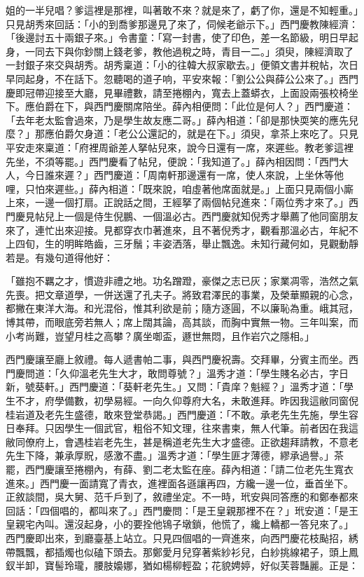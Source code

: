 \begin{showcontents}{}
姐的一半兒唱？爹這裡是那裡，叫著敢不來？就是來了，虧了你，還是不知輕重。」只見胡秀來回話：「小的到喬爹那邊見了來了，伺候老爺示下。」西門慶教陳經濟：「後邊討五十兩銀子來。」令書童：「寫一封書，使了印色，差一名節級，明日早起身，一同去下與你鈔關上錢老爹，教他過稅之時，青目一二。」須臾，陳經濟取了一封銀子來交與胡秀。胡秀稟道：「小的往韓大叔家歇去。」便領文書并稅帖，次日早同起身，不在話下。忽聽喝的道子响，平安來報：「劉公公與薛公公來了。」西門慶即冠帶迎接至大廳，見畢禮數，請至捲棚內，寬去上蓋蟒衣，上面設兩張校椅坐下。應伯爵在下，與西門慶關席陪坐。薛內相便問：「此位是何人？」西門慶道：「去年老太監會過來，乃是學生故友應二哥。」薛內相道：「卻是那快耎笑的應先兒麼？」那應伯爵欠身道：「老公公還記的，就是在下。」須臾，拿茶上來吃了。只見平安走來稟道：「府裡周爺差人拏帖兒來，說今日還有一席，來遲些。教老爹這裡先坐，不須等罷。」西門慶看了帖兒，便說：「我知道了。」薛內相因問：「西門大人，今日誰來遲？」西門慶道：「周南軒那邊還有一席，使人來說，上坐休等他哩，只怕來遲些。」薛內相道：「既來說，咱虛著他席面就是。」上面只見兩個小廝上來，一邊一個打扇。正說話之間，王經拏了兩個帖兒進來：「兩位秀才來了。」西門慶見帖兒上一個是侍生倪鵬、一個溫必古。西門慶就知倪秀才舉薦了他同窗朋友來了，連忙出來迎接。見都穿衣巾著進來，且不著倪秀才，觀看那溫必古，年紀不上四旬，生的明眸皓齒，三牙鬚；丰姿洒落，舉止飄逸。未知行藏何如，見觀動靜若是。有幾句道得他好：

「雖抱不羈之才，慣遊非禮之地。功名蹭蹬，豪傑之志已灰；家業凋零，浩然之氣先喪。把文章道學，一併送還了孔夫子。將致君澤民的事業，及榮華顯親的心念，都撇在東洋大海。和光混俗，惟其利欲是前；隨方逐圓，不以廉恥為重。峨其冠，博其帶，而眼底旁若無人；席上闊其論，高其談，而胸中實無一物。三年叫案，而小考尚難，豈望月桂之高攀？廣坐啣盃，遯世無悶，且作岩穴之隱相。」

西門慶讓至廳上敘禮。每人遞書帕二事，與西門慶祝壽。交拜畢，分賓主而坐。西門慶問道：「久仰溫老先生大才，敢問尊號？」溫秀才道：「學生賤名必古，字日新，號葵軒。」西門慶道：「葵軒老先生。」又問：「貴庠？魁經？」溫秀才道：「學生不才，府學備數，初學易經。一向久仰尊府大名，未敢進拜。昨因我這敝同窗倪桂岩道及老先生盛德，敢來登堂恭謁。」西門慶道：「不敢。承老先生先施，學生容日奉拜。只因學生一個武官，粗俗不知文理，往來書柬，無人代筆。前者因在我這敝同僚府上，會遇桂岩老先生，甚是稱道老先生大才盛德。正欲趨拜請教，不意老先生下降，兼承厚貺，感激不盡。」溫秀才道：「學生匪才薄德，繆承過譽。」茶罷，西門慶讓至捲棚內，有薛、劉二老太監在座。薛內相道：「請二位老先生寬衣進來。」西門慶一面請寬了青衣，進裡面各遜讓再四，方纔一邊一位，垂首坐下。正敘談間，吳大舅、范千戶到了，敘禮坐定。不一時，玳安與同答應的和鄭奉都來回話：「四個唱的，都叫來了。」西門慶問：「是王皇親那裡不在？」玳安道：「是王皇親宅內叫。還沒起身，小的要拴他鴇子墩鎖，他慌了，纔上轎都一答兒來了。」西門慶即出來，到廳臺基上站立。只見四個唱的一齊進來，向西門慶花枝颭招，綉帶飄飄，都插燭也似磕下頭去。那鄭愛月兒穿著紫紗衫兒，白紗挑線裙子，頭上鳳釵半卸，寶髻玲瓏，腰肢嬝娜，猶如楊柳輕盈；花貌娉婷，好似芙蓉豔麗。正是：


\end{showcontents}
